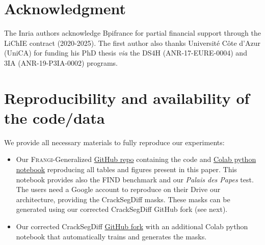 \documentclass[conference]{IEEEtran}
\newcommand{\Frangi}[0]{\textsc{Frangi}}
\begin{document}
{\footnotesize
\section*{Acknowledgment}

The Inria authors acknowledge Bpifrance for partial financial support through the LiChIE contract (2020-2025).
The first author also thanks Université Côte d’Azur (UniCA) for funding his PhD thesis \textit{via} the DS4H (ANR-17-EURE-0004) and 3IA (ANR-19-P3IA-0002) programs.

}
{\footnotesize
\section*{Reproducibility and availability of the code/data}

We provide all necessary materials to fully reproduce our experiments:
\begin{itemize}
    \item Our \Frangi{}-Generalized \href{https://github.com/Ayana-Inria/Generalized-Frangi-for-Automatic-Crack-Extraction-on-FIND-dataset}{GitHub repo} \cite{GitHubGeneralizedFrangi2026} containing the code and \href{https://colab.research.google.com/github/Ayana-Inria/Generalized-Frangi-for-Automatic-Crack-Extraction-on-FIND-dataset/blob/main/FIND_Frangi_Fusion_Avignon_Colab.ipynb}{Colab python notebook} reproducing all tables and figures present in this paper. This notebook provides also the FIND \cite{FIND2022} benchmark and our \textit{Palais des Papes} test. The users need a Google account to reproduce on their Drive our architecture, providing the CrackSegDiff masks. These masks can be generated using our corrected CrackSegDiff GitHub fork (see next).
    \item Our corrected CrackSegDiff \href{https://github.com/Ayana-Inria/CrackSegDiff}{GitHub fork} with an additional Colab python notebook that automatically trains and generates the masks. 
\end{itemize}
}






\end{document}
